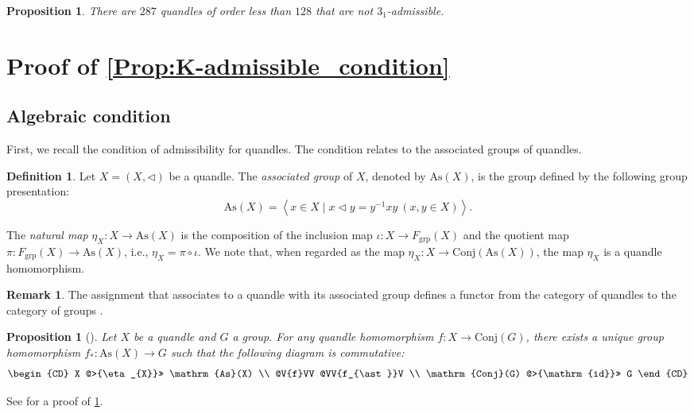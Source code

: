 \documentclass[12pt]{article}
\theoremstyle{plain}
\newtheorem{prop}[thm]{Proposition}
\theoremstyle{definition}
\newtheorem{defn}[thm]{Definition}
\newtheorem{rem}[thm]{Remark}
\newcommand{\qop}{\triangleleft}
\begin{document}
\begin{prop}
  There are $287$ quandles of order less than $128$ that are not $3_1$-admissible.
\end{prop}
\section{Proof of \cref{Prop:K-admissible_condition}}
\label{Sec:Proof}

\subsection{Algebraic condition}
First, we recall the condition of admissibility for quandles.
The condition relates to the associated groups of quandles.

\begin{defn}
  Let $X = (X, \qop)$ be a quandle.
  The \textit{associated group} of $X$, 
  denoted by $\mathrm{As}(X)$,
  is the group defined by the following group presentation:
  \begin{equation*}
    \mathrm{As}(X) = \left\langle x \in X \mid x \qop y = y^{-1} x y\ (x, y \in X)\right\rangle. 
  \end{equation*}
\end{defn}

The \textit{natural map} $\eta_{X}: X \to \mathrm{As}(X)$ is the composition of the inclusion map $\iota: X \to F_{\text{grp}}(X)$ and the quotient map $\pi: F_{\text{grp}}(X) \to \mathrm{As}(X)$, i.e.,
$\eta_{X} = \pi \circ \iota$.
We note that, when regarded as the map $\eta_{X}: X \to \mathrm{Conj}(\mathrm{As}(X))$, the map $\eta_{X}$ is a quandle homomorphism.

\begin{rem}
The assignment that associates to a quandle with its associated group defines a functor from the category of quandles to the category of groups \cite{Joyce-1982-ClassifyingInvariantKnotsKnotb}.
\label{Rem:AsFunctor}
\end{rem}

\begin{prop}[\cite{Joyce-1982-ClassifyingInvariantKnotsKnotb}]
Let $X$ be a quandle and $G$ a group.
For any quandle homomorphism $f: X \to \mathrm{Conj}(G)$,
there exists a unique group homomorphism $f_{\ast}: \mathrm{As}(X) \to G$ such that the following diagram is commutative:
\[
  \begin{CD}
        X @>{\eta_{X}}>> \mathrm{As}(X) \\
    @V{f}VV             @VV{f_{\ast}}V \\
    \mathrm{Conj}(G) @>{\mathrm{id}}>> G
  \end{CD}
\]
\label{Prop:Uni_property_of_As}
\end{prop}
See \cite{Kamada-2017-SurfaceKnots4Spacea} for a proof of \cref{Prop:Uni_property_of_As}.
\end{document}
